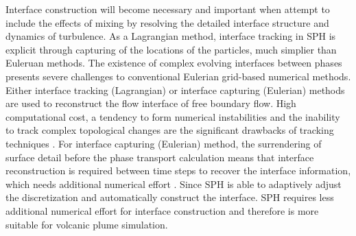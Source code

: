 \documentclass[gmd, manuscript]{copernicus}
\begin{document}
Interface construction will become necessary and important when attempt to include the effects of mixing by resolving the detailed interface structure and dynamics of turbulence. 
As a Lagrangian method, interface tracking in SPH is explicit through capturing of the locations of the particles, much simplier than Euleruan methods.
The existence of complex evolving interfaces between phases presents severe challenges to conventional Eulerian grid-based numerical methods. Either interface tracking (Lagrangian) \citep{harlow1965numerical, wrobel1991computational, cheng1995simplified} or interface capturing (Eulerian) \citep{hirt1981volume, youngs1982time, gerlach2006comparison, gopala2008volume} methods are used to reconstruct the flow interface of free boundary flow. High computational cost, a tendency to form numerical instabilities and the inability to track complex topological changes are the significant drawbacks of tracking techniques \citep{hirt1981volume, unverdi1992front, anderson1998diffuse}. For interface capturing (Eulerian) method, the surrendering of surface detail before the phase transport calculation means that interface reconstruction is required between time steps to recover the interface information, which needs additional numerical effort \citep{hirt1981volume, youngs1982time}.
Since SPH is able to adaptively adjust the discretization and automatically construct the interface. SPH requires less additional numerical effort for interface construction and therefore is more suitable for volcanic plume simulation.
\end{document}
